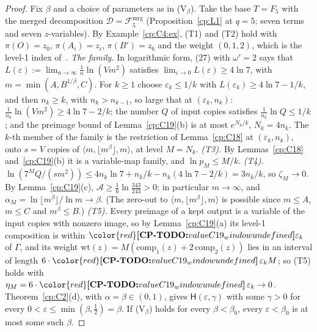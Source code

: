 \documentclass[11pt]{article}
\makeatletter
\theoremstyle{definition}
\theoremstyle{remark}
\DeclareRobustCommand{\CPTODO}[1]{{\color{red}\textbf{[CP-TODO:} #1\textbf{]}}}
\providecommand{\eps}{\varepsilon}
\newcommand{\mat}[3]{\langle #1,#2,#3\rangle} %
\newcommand{\Hyp}{\mathsf{H}}                 %
\newcommand{\Tcond}[1]{\textup{(T#1)}}        %
\newcommand{\Fmrgq}[1]{\mathcal{F}^{\mathrm{mrg}}_{#1}} %
\newcommand{\Bp}{B'}                          %
\newcommand{\Oterm}{O}                        %
\newcommand{\Acs}{\mathcal A}                %
\newcommand{\wt}{\mathrm{wt}}                %
\newcommand{\Vhyp}[1]{\textup{(V$_{#1}$)}}   %
\newcommand{\bz}{\beta_0}                    %
\newcommand{\cpv}[1]{\ifcsname cpv@#1\endcsname\csname cpv@#1\endcsname\else\CPTODO{value #1 undefined}\fi}
\makeatother
\begin{document}
\begin{proof}
Fix $\beta$ and a choice of parameters as in \Vhyp\beta. Take the base $T=F_5$ with the merged decomposition $\mathcal D=\Fmrgq{5}$ (Proposition~\ref{cp:L1} at $q=5$; seven terms and seven $z$-variables). By Example~\ref{cp:C4:ex}, \Tcond1{} and \Tcond2{} hold with $\pi(\Oterm)=z_0$, $\pi(A_i)=z_i$, $\pi(\Bp)=z_6$ and the weight $(0,1,2)$, which is the level-1 index of~\cite{VXXZ24}.
\emph{The family.} In logarithmic form, (27) with $\omega'=2$ says that $L(\eps):=\lim_{n\to\infty}\frac1n\ln(Vm^2)$ satisfies $\lim_{\eps\to0}L(\eps)\ge4\ln7$, with $m=\min(A,B^{1/\beta},C)$. For $k\ge1$ choose $\eps_k\le1/k$ with $L(\eps_k)\ge4\ln7-1/k$, and then $n_k\ge k$, with $n_k>n_{k-1}$, so large that at $(\eps_k,n_k)$: $\frac1{n_k}\ln(Vm^2)\ge4\ln7-2/k$; the number $Q$ of input copies satisfies $\frac1{n_k}\ln Q\le1/k$; and the preimage bound of Lemma~\ref{cp:C19}(b) is at most $e^{N_k/k}$, $N_k=4n_k$. The $k$-th member of the family is the restriction of Lemma~\ref{cp:C18} at $(\eps_k,n_k)$, onto $s=V$ copies of $\mat m{\lfloor m^\beta\rfloor}m$, at level $M=N_k$.
\emph{\Tcond3.} By Lemmas~\ref{cp:C18} and~\ref{cp:C19}(b) it is a variable-map family, and $\ln p_M\le M/k$.
\emph{\Tcond4.} $\ln(7^MQ/(sm^2))\le4n_k\ln7+n_k/k-n_k(4\ln7-2/k)=3n_k/k$, so $\zeta_M\to0$. By Lemma~\ref{cp:C19}(c), $\Acs\ge\frac16\ln\frac{343}{243}>0$; in particular $m\to\infty$, and $\alpha_M=\ln\lfloor m^\beta\rfloor/\ln m\to\beta$. (The zero-out to $\mat m{\lfloor m^\beta\rfloor}m$ is possible since $m\le A$, $m\le C$ and $m^\beta\le B$.)
\emph{\Tcond5.} Every preimage of a kept output is a variable of the input copies with nonzero image, so by Lemma~\ref{cp:C19}(a) its level-1 composition is within $\cpv{C19_window}\eps_k$ of $\Gamma$, and its weight $\wt(z)=M(\mathrm{comp}_1(z)+2\,\mathrm{comp}_2(z))$ lies in an interval of length $6\cdot\cpv{C19_window}\,\eps_kM$; so \Tcond5{} holds with $\eta_M=6\cdot\cpv{C19_window}\,\eps_k\to0$.
Theorem~\ref{cp:C2}(d), with $\alpha=\beta\in(0,1)$, gives $\Hyp(\eps,\gamma)$ with some $\gamma>0$ for every $0<\eps\le\min(\beta,\frac12)=\beta$. If \Vhyp\beta{} holds for every $\beta<\bz$, every $\eps<\bz$ is at most some such $\beta$.
\end{proof}
\end{document}
